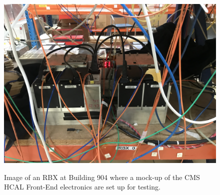 \begin{figure}[!htbp]
	\centering
    \caption{Image of an RBX at Building 904 where a mock-up of the CMS HCAL Front-End electronics are set up for testing.}    
	\includegraphics[scale=0.07]{fig/RBXBurn-in.jpg}
	\label{fig:RBXBurnin904}
\end{figure}


